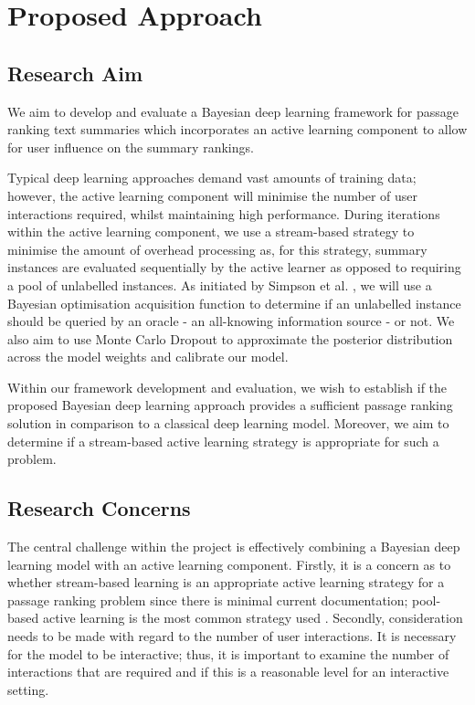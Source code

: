 \documentclass[ %
                    author={James Stephenson},
                supervisor={Dr. Edwin Simpson},
                    degree={MSc},
                     title={PROJECT PLAN},
                  subtitle={ Bayesian Deep Learning For Extractive Test Summarisation},
                      type={},
                      year={2022}]{../additions/dissertation}
\begin{document}
		\section{Proposed Approach}
		\label{chap:introduction:prop_approach}
		
			\subsection{Research Aim}
			\label{chap:introduction:prop_approach:aim}
			
				We aim to develop and evaluate a Bayesian deep learning framework for passage ranking text summaries which incorporates an active learning component to allow for user influence on the summary rankings.
				
				\medbreak
				Typical deep learning approaches demand vast amounts of training data; however, the active learning component will minimise the number of user interactions required, whilst maintaining high performance. During iterations within the active learning component, we use a stream-based strategy to minimise the amount of overhead processing as, for this strategy, summary instances are evaluated sequentially by the active learner as opposed to requiring a pool of unlabelled instances. As initiated by Simpson et al. \cite{Simpson19}, we will use a Bayesian optimisation acquisition function to determine if an unlabelled instance should be queried by an oracle - an all-knowing information source - or not. We also aim to use Monte Carlo Dropout \cite{Gal15} to approximate the posterior distribution across the model weights and calibrate our model.

				\medbreak
				Within our framework development and evaluation, we wish to establish if the proposed Bayesian deep learning approach provides a sufficient passage ranking solution in comparison to a classical deep learning model. Moreover, we aim to determine if a stream-based active learning strategy is appropriate for such a problem.
				
			\subsection{Research Concerns}
			\label{chap:introduction:prop_approach:concerns}

				The central challenge within the project is effectively combining a Bayesian deep learning model with an active learning component. Firstly, it is a concern as to whether stream-based learning is an appropriate active learning strategy for a passage ranking problem since there is minimal current documentation; pool-based active learning is the most common strategy used \cite{Settles09}. Secondly, consideration needs to be made with regard to the number of user interactions. It is necessary for the model to be interactive; thus, it is important to examine the number of interactions that are required and if this is a reasonable level for an interactive setting.
		
\end{document}
